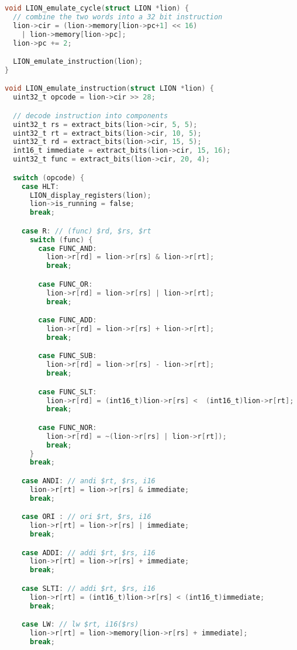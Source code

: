 \begin{lstlisting}[language=C]
void LION_emulate_cycle(struct LION *lion) {
  // combine the two words into a 32 bit instruction
  lion->cir = (lion->memory[lion->pc+1] << 16) 
    | lion->memory[lion->pc];
  lion->pc += 2;    

  LION_emulate_instruction(lion);
}

void LION_emulate_instruction(struct LION *lion) {
  uint32_t opcode = lion->cir >> 28;

  // decode instruction into components 
  uint32_t rs = extract_bits(lion->cir, 5, 5);
  uint32_t rt = extract_bits(lion->cir, 10, 5);
  uint32_t rd = extract_bits(lion->cir, 15, 5);
  int16_t immediate = extract_bits(lion->cir, 15, 16);
  uint32_t func = extract_bits(lion->cir, 20, 4);

  switch (opcode) {
    case HLT:
      LION_display_registers(lion);
      lion->is_running = false;
      break;

    case R: // (func) $rd, $rs, $rt
      switch (func) {
        case FUNC_AND:
          lion->r[rd] = lion->r[rs] & lion->r[rt];
          break;

        case FUNC_OR:
          lion->r[rd] = lion->r[rs] | lion->r[rt];
          break;

        case FUNC_ADD:
          lion->r[rd] = lion->r[rs] + lion->r[rt];
          break;

        case FUNC_SUB:
          lion->r[rd] = lion->r[rs] - lion->r[rt];
          break;

        case FUNC_SLT:
          lion->r[rd] = (int16_t)lion->r[rs] <  (int16_t)lion->r[rt];
          break;

        case FUNC_NOR:
          lion->r[rd] = ~(lion->r[rs] | lion->r[rt]);
          break;
      }
      break;

    case ANDI: // andi $rt, $rs, i16
      lion->r[rt] = lion->r[rs] & immediate;
      break;

    case ORI : // ori $rt, $rs, i16
      lion->r[rt] = lion->r[rs] | immediate;
      break;

    case ADDI: // addi $rt, $rs, i16
      lion->r[rt] = lion->r[rs] + immediate;
      break;

    case SLTI: // addi $rt, $rs, i16
      lion->r[rt] = (int16_t)lion->r[rs] < (int16_t)immediate;
      break;

    case LW: // lw $rt, i16($rs)
      lion->r[rt] = lion->memory[lion->r[rs] + immediate];
      break;


\end{lstlisting}
